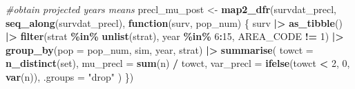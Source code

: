 \documentclass[
]{article}
\newenvironment{Shaded}{\begin{snugshade}}{\end{snugshade}}
\newcommand{\AttributeTok}[1]{\textcolor[rgb]{0.13,0.29,0.53}{#1}}
\newcommand{\CommentTok}[1]{\textcolor[rgb]{0.56,0.35,0.01}{\textit{#1}}}
\newcommand{\ControlFlowTok}[1]{\textcolor[rgb]{0.13,0.29,0.53}{\textbf{#1}}}
\newcommand{\DecValTok}[1]{\textcolor[rgb]{0.00,0.00,0.81}{#1}}
\newcommand{\FunctionTok}[1]{\textcolor[rgb]{0.13,0.29,0.53}{\textbf{#1}}}
\newcommand{\NormalTok}[1]{#1}
\newcommand{\OtherTok}[1]{\textcolor[rgb]{0.56,0.35,0.01}{#1}}
\newcommand{\SpecialCharTok}[1]{\textcolor[rgb]{0.81,0.36,0.00}{\textbf{#1}}}
\newcommand{\StringTok}[1]{\textcolor[rgb]{0.31,0.60,0.02}{#1}}
\begin{document}
\begin{Shaded}
\begin{Highlighting}[]
\CommentTok{\#obtain projected years means}
\NormalTok{precl\_mu\_post }\OtherTok{\textless{}{-}} \FunctionTok{map2\_dfr}\NormalTok{(survdat\_precl, }\FunctionTok{seq\_along}\NormalTok{(survdat\_precl), }\ControlFlowTok{function}\NormalTok{(surv, pop\_num) \{}
\NormalTok{  surv }\SpecialCharTok{|\textgreater{}}
    \FunctionTok{as\_tibble}\NormalTok{() }\SpecialCharTok{|\textgreater{}}
    \FunctionTok{filter}\NormalTok{(strat }\SpecialCharTok{\%in\%} \FunctionTok{unlist}\NormalTok{(strat), year }\SpecialCharTok{\%in\%} \DecValTok{6}\SpecialCharTok{:}\DecValTok{15}\NormalTok{, AREA\_CODE }\SpecialCharTok{!=} \DecValTok{1}\NormalTok{) }\SpecialCharTok{|\textgreater{}}
    \FunctionTok{group\_by}\NormalTok{(}\AttributeTok{pop =}\NormalTok{ pop\_num, sim, year, strat) }\SpecialCharTok{|\textgreater{}}
    \FunctionTok{summarise}\NormalTok{(}
      \AttributeTok{towct =} \FunctionTok{n\_distinct}\NormalTok{(set),}
      \AttributeTok{mu\_precl =} \FunctionTok{sum}\NormalTok{(n) }\SpecialCharTok{/}\NormalTok{ towct,}
      \AttributeTok{var\_precl =} \FunctionTok{ifelse}\NormalTok{(towct }\SpecialCharTok{\textless{}} \DecValTok{2}\NormalTok{, }\DecValTok{0}\NormalTok{, }\FunctionTok{var}\NormalTok{(n)),}
      \AttributeTok{.groups =} \StringTok{"drop"}
\NormalTok{    )}
\NormalTok{\})}


\end{Highlighting}
\end{Shaded}
\end{document}
